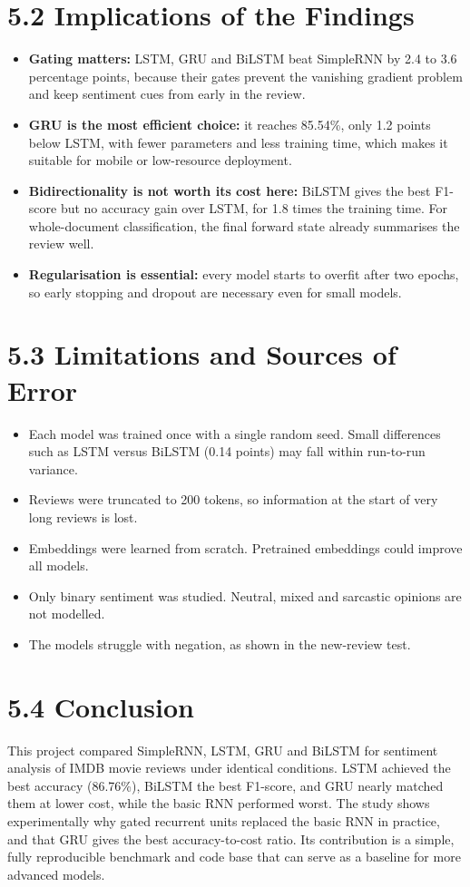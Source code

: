 \documentclass[12pt,a4paper,oneside]{report}
\begin{document}
\section*{5.2 Implications of the Findings}
\begin{itemize}
\item \textbf{Gating matters:} LSTM, GRU and BiLSTM beat SimpleRNN by 2.4 to 3.6 percentage points, because their gates prevent the vanishing gradient problem and keep sentiment cues from early in the review.
\item \textbf{GRU is the most efficient choice:} it reaches 85.54\%, only 1.2 points below LSTM, with fewer parameters and less training time, which makes it suitable for mobile or low-resource deployment.
\item \textbf{Bidirectionality is not worth its cost here:} BiLSTM gives the best F1-score but no accuracy gain over LSTM, for 1.8 times the training time. For whole-document classification, the final forward state already summarises the review well.
\item \textbf{Regularisation is essential:} every model starts to overfit after two epochs, so early stopping and dropout are necessary even for small models.
\end{itemize}
\section*{5.3 Limitations and Sources of Error}
\begin{itemize}
\item Each model was trained once with a single random seed. Small differences such as LSTM versus BiLSTM (0.14 points) may fall within run-to-run variance.
\item Reviews were truncated to 200 tokens, so information at the start of very long reviews is lost.
\item Embeddings were learned from scratch. Pretrained embeddings could improve all models.
\item Only binary sentiment was studied. Neutral, mixed and sarcastic opinions are not modelled.
\item The models struggle with negation, as shown in the new-review test.
\end{itemize}
\section*{5.4 Conclusion}
This project compared SimpleRNN, LSTM, GRU and BiLSTM for sentiment analysis of IMDB movie reviews under identical conditions. LSTM achieved the best accuracy (86.76\%), BiLSTM the best F1-score, and GRU nearly matched them at lower cost, while the basic RNN performed worst. The study shows experimentally why gated recurrent units replaced the basic RNN in practice, and that GRU gives the best accuracy-to-cost ratio. Its contribution is a simple, fully reproducible benchmark and code base that can serve as a baseline for more advanced models.
\end{document}
